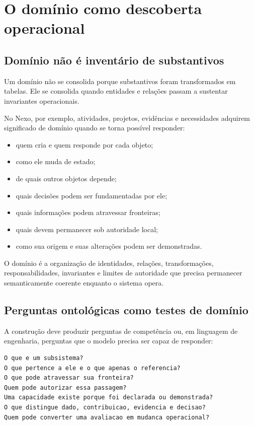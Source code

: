 \documentclass[11pt,a4paper,oneside]{article}
\begin{document}
\section{O domínio como descoberta operacional}

\subsection{Domínio não é inventário de substantivos}

Um domínio não se consolida porque substantivos foram transformados em tabelas. Ele se consolida quando entidades e relações passam a sustentar invariantes operacionais.

No Nexo, por exemplo, atividades, projetos, evidências e necessidades adquirem significado de domínio quando se torna possível responder:

\begin{itemize}
  \item quem cria e quem responde por cada objeto;
  \item como ele muda de estado;
  \item de quais outros objetos depende;
  \item quais decisões podem ser fundamentadas por ele;
  \item quais informações podem atravessar fronteiras;
  \item quais devem permanecer sob autoridade local;
  \item como sua origem e suas alterações podem ser demonstradas.
\end{itemize}

\begin{principio}
O domínio é a organização de identidades, relações, transformações, responsabilidades, invariantes e limites de autoridade que precisa permanecer semanticamente coerente enquanto o sistema opera.
\end{principio}

\subsection{Perguntas ontológicas como testes de domínio}

A construção deve produzir perguntas de competência ou, em linguagem de engenharia, perguntas que o modelo precisa ser capaz de responder:

\begin{lstlisting}
O que e um subsistema?
O que pertence a ele e o que apenas o referencia?
O que pode atravessar sua fronteira?
Quem pode autorizar essa passagem?
Uma capacidade existe porque foi declarada ou demonstrada?
O que distingue dado, contribuicao, evidencia e decisao?
Quem pode converter uma avaliacao em mudanca operacional?
\end{lstlisting}
\end{document}
